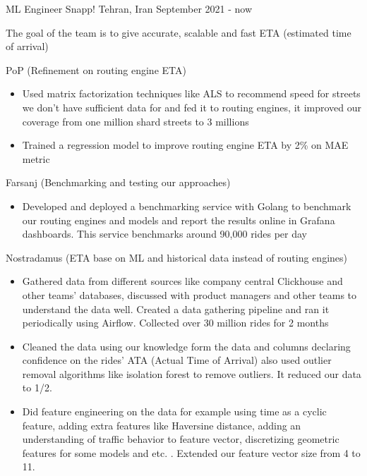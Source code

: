\begin{cventries}
  \cventry
    {ML Engineer} %
    {Snapp!} %
    {Tehran, Iran} %
    {September 2021 - now} %
    {
      \begin{cvitems} %
        \item The goal of the team is to give accurate, scalable and fast ETA (estimated time of arrival)
        \item PoP (Refinement on routing engine ETA)
        \begin{itemize}
          \item Used matrix factorization techniques like ALS to recommend speed for streets we don't have sufficient data for and fed it to routing engines, it improved our coverage from one million shard streets to 3 millions
          \item Trained a regression model to improve routing engine ETA by 2\% on MAE metric
        \end{itemize}
        \item Farsanj (Benchmarking and testing our approaches)
        \begin{itemize}
          \item Developed and deployed a benchmarking service with Golang to benchmark our routing engines and models and report the results online in Grafana dashboards. This service benchmarks around 90,000 rides per day
        \end{itemize}
        \item Nostradamus (ETA base on ML and historical data instead of routing engines)
        \begin{itemize}
          \item Gathered data from different sources like company central Clickhouse and other teams' databases, discussed with product managers and other teams to understand the data well. Created a data gathering pipeline and ran it periodically using Airflow. Collected over 30 million rides for 2 months
          \item Cleaned the data using our knowledge form the data and columns declaring confidence on the rides' ATA (Actual Time of Arrival) also used outlier removal algorithms like isolation forest to remove outliers. It reduced our data to 1/2.
          \item Did feature engineering on the data for example using time as a cyclic feature, adding extra features like Haversine distance, adding an understanding of traffic behavior to feature vector, discretizing geometric features for some models and etc. . Extended our feature vector size from 4 to 11.

\end{itemize}
\end{cvitems}}
\end{cventries}
